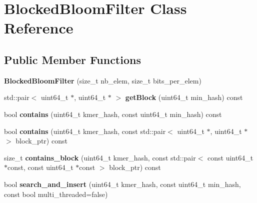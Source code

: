\hypertarget{classBlockedBloomFilter}{}\section{Blocked\+Bloom\+Filter Class Reference}
\label{classBlockedBloomFilter}
\subsection*{Public Member Functions}
\begin{DoxyCompactItemize}
\item 
\mbox{\label{classBlockedBloomFilter_a053e0a34e9046e60f5d465e5b6def59d}} 
{\bfseries Blocked\+Bloom\+Filter} (size\+\_\+t nb\+\_\+elem, size\+\_\+t bits\+\_\+per\+\_\+elem)
\item 
\mbox{\label{classBlockedBloomFilter_a2ee58380b0e689bc767885aa3a88c491}} 
std\+::pair$<$ uint64\+\_\+t $\ast$, uint64\+\_\+t $\ast$ $>$ {\bfseries get\+Block} (uint64\+\_\+t min\+\_\+hash) const
\item 
\mbox{\label{classBlockedBloomFilter_a8fc65fe2e25ca923423c356466d462db}} 
bool {\bfseries contains} (uint64\+\_\+t kmer\+\_\+hash, const uint64\+\_\+t min\+\_\+hash) const
\item 
\mbox{\label{classBlockedBloomFilter_a342e3093eb7e8861f9e046bfac2bcff2}} 
bool {\bfseries contains} (uint64\+\_\+t kmer\+\_\+hash, const std\+::pair$<$ uint64\+\_\+t $\ast$, uint64\+\_\+t $\ast$$>$ block\+\_\+ptr) const
\item 
\mbox{\label{classBlockedBloomFilter_ac15d8745064be9d7514cff242ce7d750}} 
size\+\_\+t {\bfseries contains\+\_\+block} (uint64\+\_\+t kmer\+\_\+hash, const std\+::pair$<$ const uint64\+\_\+t $\ast$const, const uint64\+\_\+t $\ast$const $>$ block\+\_\+ptr) const
\item 
\mbox{\label{classBlockedBloomFilter_a7b592390c0708aa445ace6c28afd83b3}} 
bool {\bfseries search\+\_\+and\+\_\+insert} (uint64\+\_\+t kmer\+\_\+hash, const uint64\+\_\+t min\+\_\+hash, const bool multi\+\_\+threaded=false)
\item 
\mbox{\label{classBlockedBloomFilter_a2f65d60d2e402efb879f129c30a8d82a}} 
$$
\end{DoxyCompactItemize}

